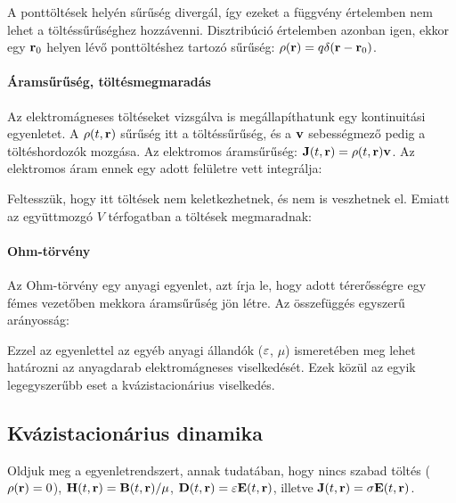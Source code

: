    A ponttöltések helyén sűrűség divergál, így ezeket a függvény értelemben nem lehet a töltéssűrűséghez hozzávenni. Disztribúció értelemben azonban igen, ekkor egy $\mathbf{r}_0$ helyen lévő ponttöltéshez tartozó sűrűség: $\rho(\mathbf{r})=q\delta(\mathbf{r}-\mathbf{r}_0)$. 
   
  \paragraph{Áramsűrűség, töltésmegmaradás}
   
   Az elektromágneses töltéseket vizsgálva is megállapíthatunk egy kontinuitási egyenletet. A $\rho(t,\mathbf{r})$ sűrűség itt a töltéssűrűség, és a $\mathbf{v}$ sebességmező pedig a töltéshordozók mozgása. Az elektromos áramsűrűség: $\mathbf{J}(t,\mathbf{r})=\rho(t,\mathbf{r})\mathbf{v}$. Az elektromos áram ennek egy adott felületre vett integrálja:
   
   Feltesszük, hogy itt töltések nem keletkezhetnek, és nem is veszhetnek el. Emiatt az együttmozgó $V$ térfogatban a töltések megmaradnak:
   
  \paragraph{Ohm-törvény}
   
   Az Ohm-törvény egy anyagi egyenlet, azt írja le, hogy adott térerősségre egy fémes vezetőben mekkora áramsűrűség jön létre. Az összefüggés egyszerű arányosság:
   
   Ezzel az egyenlettel az egyéb anyagi állandók ($\varepsilon$, $\mu$) ismeretében meg lehet határozni az anyagdarab elektromágneses viselkedését. Ezek közül az egyik legegyszerűbb eset a kvázistacionárius  viselkedés.
   
  \subsection{Kvázistacionárius dinamika}\label{ss:08-kvazistacdin}
   
   Oldjuk meg a 
   egyenletrendszert, annak tudatában, hogy nincs szabad töltés ($\rho(\mathbf{r})=0$), $\mathbf{H}(t,\mathbf{r})=\mathbf{B}(t,\mathbf{r})/\mu$, $\mathbf{D}(t,\mathbf{r})=\varepsilon\mathbf{E}(t,\mathbf{r})$, illetve $\mathbf{J}(t,\mathbf{r})=\sigma\mathbf{E}(t,\mathbf{r})$.
   

